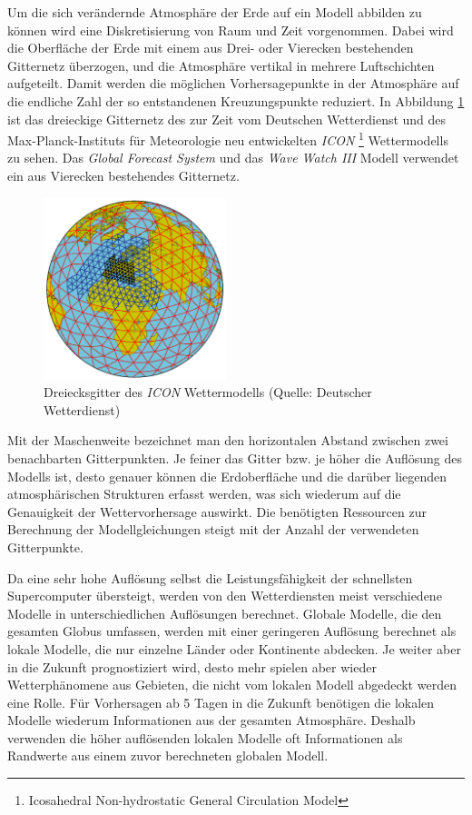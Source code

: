 Um die sich verändernde Atmosphäre der Erde auf ein Modell abbilden zu
können wird eine Diskretisierung von Raum und Zeit vorgenommen. Dabei
wird die Oberfläche der Erde mit einem aus Drei- oder Vierecken
bestehenden Gitternetz überzogen, und die Atmosphäre vertikal in
mehrere Luftschichten aufgeteilt. Damit werden die möglichen
Vorhersagepunkte in der Atmosphäre auf die endliche Zahl der so
entstandenen Kreuzungspunkte reduziert. In Abbildung \ref{gitternetz}
ist das dreieckige Gitternetz des zur Zeit vom Deutschen Wetterdienst
und des Max-Planck-Instituts für Meteorologie neu entwickelten
\textit{ICON} \footnote{Icosahedral Non-hydrostatic General
  Circulation Model}  Wettermodells zu sehen. Das
\textit{Global Forecast System} und das \textit{Wave Watch III} Modell
verwendet ein aus Vierecken bestehendes Gitternetz.

\begin{figure}[h]
  \begin{center}
    \includegraphics[height=200px]{bilder/gitternetz}
    \caption{Dreiecksgitter des \textit{ICON} Wettermodells (Quelle:
      Deutscher Wetterdienst)}
    \label{gitternetz}
  \end{center}
\end{figure}

Mit der Maschenweite bezeichnet man den horizontalen Abstand zwischen
zwei benachbarten Gitterpunkten. Je feiner das Gitter bzw. je höher
die Auflösung des Modells ist, desto genauer können die Erdoberfläche
und die darüber liegenden atmosphärischen Strukturen erfasst werden,
was sich wiederum auf die Genauigkeit der Wettervorhersage
auswirkt. Die benötigten Ressourcen zur Berechnung der
Modellgleichungen steigt mit der Anzahl der verwendeten Gitterpunkte.

Da eine sehr hohe Auflösung selbst die Leistungsfähigkeit der
schnellsten Supercomputer übersteigt, werden von den Wetterdiensten
meist verschiedene Modelle in unterschiedlichen Auflösungen
berechnet. Globale Modelle, die den gesamten Globus umfassen, werden
mit einer geringeren Auflösung berechnet als lokale Modelle, die nur
einzelne Länder oder Kontinente abdecken. Je weiter aber in die
Zukunft prognostiziert wird, desto mehr spielen aber wieder
Wetterphänomene aus Gebieten, die nicht vom lokalen Modell abgedeckt
werden eine Rolle. Für Vorhersagen ab 5 Tagen in die Zukunft benötigen
die lokalen Modelle wiederum Informationen aus der gesamten
Atmosphäre. Deshalb verwenden die höher auflösenden lokalen Modelle
oft Informationen als Randwerte aus einem zuvor berechneten globalen
Modell.

